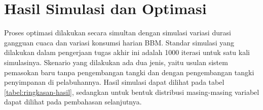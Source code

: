 \section{Hasil Simulasi dan Optimasi}
\label{sec:hasil-simulasi-optimasi}

Proses optimasi dilakukan secara simultan dengan simulasi variasi durasi gangguan cuaca dan variasi konsumsi harian BBM. Standar simulasi yang dilakukan dalam pengerjaan tugas akhir ini adalah 1000 iterasi untuk satu kali simulasinya. Skenario yang dilakukan ada dua jenis, yaitu usulan sistem pemasokan baru tanpa pengembangan tangki dan dengan pengembangan tangki penyimpanan di pelabuhannya. Hasil simulasi dapat dilihat pada tabel \ref{tabel:ringkasan-hasil}, sedangkan untuk bentuk distribusi masing-masing variabel dapat dilihat pada pembahasan selanjutnya.

